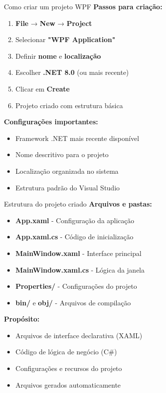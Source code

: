 \documentclass[aspectratio=169]{beamer}
\begin{document}
\begin{frame}{Como criar um projeto WPF}
\textbf{Passos para criação:}
\begin{enumerate}
    \item \textbf{File} → \textbf{New} → \textbf{Project}
    \item Selecionar \textbf{"WPF Application"}
    \item Definir \textbf{nome} e \textbf{localização}
    \item Escolher \textbf{.NET 8.0} (ou mais recente)
    \item Clicar em \textbf{Create}
    \item Projeto criado com estrutura básica
\end{enumerate}

\textbf{Configurações importantes:}
\begin{itemize}
    \item Framework .NET mais recente disponível
    \item Nome descritivo para o projeto
    \item Localização organizada no sistema
    \item Estrutura padrão do Visual Studio
\end{itemize}
\end{frame}

\begin{frame}{Estrutura do projeto criado}
\textbf{Arquivos e pastas:}
\begin{itemize}
    \item \textbf{App.xaml} - Configuração da aplicação
    \item \textbf{App.xaml.cs} - Código de inicialização
    \item \textbf{MainWindow.xaml} - Interface principal
    \item \textbf{MainWindow.xaml.cs} - Lógica da janela
    \item \textbf{Properties/} - Configurações do projeto
    \item \textbf{bin/} e \textbf{obj/} - Arquivos de compilação
\end{itemize}

\textbf{Propósito:}
\begin{itemize}
    \item Arquivos de interface declarativa (XAML)
    \item Código de lógica de negócio (C\#)
    \item Configurações e recursos do projeto
    \item Arquivos gerados automaticamente
\end{itemize}
\end{frame}
\end{document}
